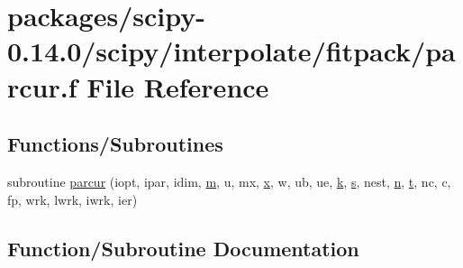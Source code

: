 \hypertarget{parcur_8f}{}\section{packages/scipy-\/0.14.0/scipy/interpolate/fitpack/parcur.f File Reference}
\label{parcur_8f}
\subsection*{Functions/\+Subroutines}
\begin{DoxyCompactItemize}
\item 
subroutine \hyperlink{parcur_8f_a15e9c804757fe4c5a6bb9ec38e785823}{parcur} (iopt, ipar, idim, \hyperlink{indexexpr_8h_ab72fdb4031d47b75ab26dd18a437bcdc}{m}, u, mx, \hyperlink{vecnorm1_8cc_ac73eed9e41ec09d58f112f06c2d6cb63}{x}, w, ub, ue, \hyperlink{indexexpr_8h_abb72938a198351550846b37a84588b63}{k}, \hyperlink{indexexpr_8h_ae024b0db549122b44c349ae28ec990dc}{s}, nest, \hyperlink{indexexpr_8h_ab427e2e2b4d6cec55fa088ea2a692ace}{n}, \hyperlink{indexexpr_8h_a01709998b82be3f34e0412206618d09d}{t}, nc, c, fp, wrk, lwrk, iwrk, ier)
\end{DoxyCompactItemize}


\subsection{Function/\+Subroutine Documentation}
\hypertarget{parcur_8f_a15e9c804757fe4c5a6bb9ec38e785823}{}
